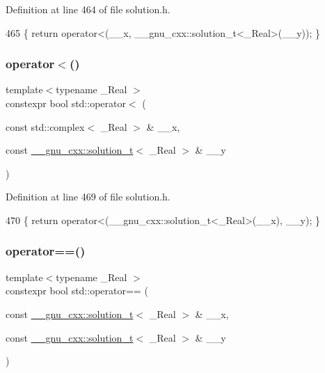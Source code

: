 Definition at line 464 of file solution.\+h.


\begin{DoxyCode}
465     \{ \textcolor{keywordflow}{return} operator<(\_\_x, \_\_gnu\_cxx::solution\_t<\_Real>(\_\_y)); \}
\end{DoxyCode}
\mbox{\label{namespacestd_a907778dd7263e96c120e62cc0901dde9}} 
\subsubsection{\texorpdfstring{operator$<$()}{operator<()}\hspace{0.1cm}{\footnotesize\ttfamily [5/5]}}
{\footnotesize\ttfamily template$<$typename \+\_\+\+Real $>$ \\
constexpr bool std\+::operator$<$ (\begin{DoxyParamCaption}\item[{const std\+::complex$<$ \+\_\+\+Real $>$ \&}]{\+\_\+\+\_\+x,  }\item[{const \hyperlink{namespace____gnu__cxx_ae20ea642de50eb361074c62676b0159c}{\+\_\+\+\_\+gnu\+\_\+cxx\+::solution\+\_\+t}$<$ \+\_\+\+Real $>$ \&}]{\+\_\+\+\_\+y }\end{DoxyParamCaption})}



Definition at line 469 of file solution.\+h.


\begin{DoxyCode}
470     \{ \textcolor{keywordflow}{return} operator<(\_\_gnu\_cxx::solution\_t<\_Real>(\_\_x), \_\_y); \}
\end{DoxyCode}
\mbox{\label{namespacestd_aeae8446ca6e32925d681634d5db05780}} 
\subsubsection{\texorpdfstring{operator==()}{operator==()}\hspace{0.1cm}{\footnotesize\ttfamily [1/5]}}
{\footnotesize\ttfamily template$<$typename \+\_\+\+Real $>$ \\
constexpr bool std\+::operator== (\begin{DoxyParamCaption}\item[{const \hyperlink{namespace____gnu__cxx_ae20ea642de50eb361074c62676b0159c}{\+\_\+\+\_\+gnu\+\_\+cxx\+::solution\+\_\+t}$<$ \+\_\+\+Real $>$ \&}]{\+\_\+\+\_\+x,  }\item[{const \hyperlink{namespace____gnu__cxx_ae20ea642de50eb361074c62676b0159c}{\+\_\+\+\_\+gnu\+\_\+cxx\+::solution\+\_\+t}$<$ \+\_\+\+Real $>$ \&}]{\+\_\+\+\_\+y }\end{DoxyParamCaption})}

